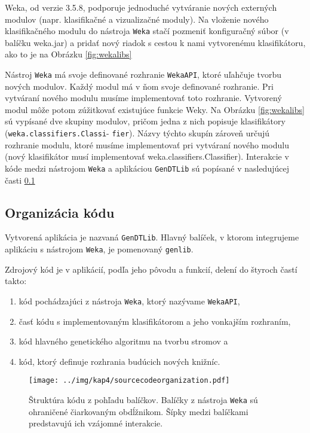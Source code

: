 Weka, od verzie 3.5.8, podporuje jednoduché vytváranie nových externých modulov (napr. klasifikačné a vizualizačné moduly). Na vloženie nového klasifikačného modulu do nástroja \verb|Weka| stačí pozmeniť konfiguračný súbor (v balíčku weka.jar) a pridať nový riadok s cestou k nami vytvorenému klasifikátoru, ako to je na Obrázku \ref{fig:wekalibs}

Nástroj \verb|Weka| má svoje definované rozhranie \verb|WekaAPI|, ktoré uľahčuje tvorbu nových modulov. Každý modul má v ňom svoje definované rozhranie. Pri vytváraní nového modulu musíme implementovať toto rozhranie. Vytvorený modul môže potom zúžitkovať existujúce funkcie Weky. Na Obrázku \ref{fig:wekalibs} sú vypísané dve skupiny modulov, pričom jedna z nich popisuje klasifikátory (\verb|weka.classifiers.Classi|- \verb|fier|). Názvy týchto skupín zároveň určujú rozhranie modulu, ktoré musíme implementovať pri vytváraní nového modulu (nový klasifikátor musí implementovať weka.classifiers.Classifier).
Interakcie v kóde medzi nástrojom \verb|Weka| a aplikáciou \verb|GenDTLib| sú popísané v nasledujúcej časti \ref{kap4:4.2:4.2.2:CodeOrganization}

\subsection{Organizácia kódu}\label{kap4:4.2:4.2.2:CodeOrganization}
\begin{observation}
Vytvorená aplikácia je nazvaná \verb|GenDTLib|. Hlavný balíček, v ktorom integrujeme aplikáciu s nástrojom \verb|Weka|, je pomenovaný \verb|genlib|.
\end{observation}

Zdrojový kód je v aplikácií, podľa jeho pôvodu a funkcií, delení do štyroch častí takto:
\begin{enumerate}
\item kód pochádzajúci z nástroja \verb|Weka|, ktorý nazývame \verb|WekaAPI|,
\item časť kódu s implementovaným klasifikátorom a jeho vonkajším rozhraním,
\item kód hlavného genetického algoritmu na tvorbu stromov a
\item kód, ktorý definuje rozhrania budúcich nových knižníc.
\end{enumerate}

\begin{figure}[h]
\centering
\centerline{\mbox{\texttt{[image: ../img/kap4/sourcecodeorganization.pdf]}}}
\caption{Štruktúra kódu z pohľadu balíčkov. Balíčky z nástroja \texttt{Weka} sú ohraničené čiarkovaným obdĺžnikom. Šípky medzi balíčkami predstavujú ich vzájomné interakcie.}\label{fig:GenLibPackage}
\end{figure}

